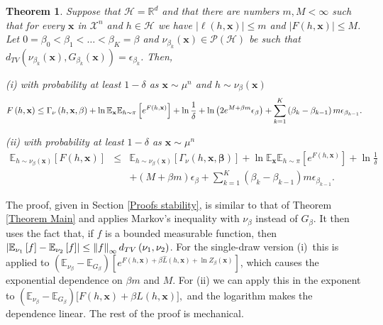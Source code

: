 \documentclass{article} %
\newtheorem{theorem}{Theorem}[section]
\begin{document}
\begin{theorem}
\label{Theorem BV approximations}Suppose that $\mathcal{H}=\mathbb{R}^{d}$
and that there are numbers $m,M<\infty $ such that for every $\mathbf{x}$ in 
$\mathcal{X}^{n}$ and $h\in \mathcal{H}$ we have $\left\vert \ell \left( h,%
\mathbf{x}\right) \right\vert \leq m$ and $\left\vert F\left( h,\mathbf{x}%
\right) \right\vert \leq M$. Let $0=\beta _{0}<\beta _{1}<\dots<\beta
_{K}=\beta $ and $\nu _{\beta _{k}}\left( \mathbf{x}\right) \in \mathcal{P}%
\left( \mathcal{H}\right) $ be such that $d_{TV}\left( \nu _{\beta
_{k}}\left( \mathbf{x}\right) ,G_{\beta_{k} }\left( \mathbf{x}\right) \right)
=\epsilon _{\beta _{k}}$. Then,

(i) with probability at least $1-\delta $ as $\mathbf{x}\sim \mu ^{n}$ and $
h\sim \nu _{\beta }\left( \mathbf{x}\right) $%
\begin{equation*}
F\left( h,\mathbf{x}\right) \leq \Gamma _{\nu }\left( h,\mathbf{x},\mathbf{%
\beta }\right) +\ln \mathbb{E}_{\mathbf{x}}\mathbb{E}_{h\sim \pi }\left[
e^{F\left( h,\mathbf{x}\right) }\right] +\ln \frac{1}{\delta } +\ln \left( 2e^{M+\beta m}\epsilon _{\beta }\right) +\sum_{k=1}^{K}\left(
\beta_{k}-\beta _{k-1}\right) m\epsilon _{\beta _{k-1}}.
\end{equation*}

(ii) with probability at least $1-\delta $ as $\mathbf{x}\sim \mu ^{n}$ 
\begin{eqnarray*}
\mathbb{E}_{h\sim \nu _{\beta }\left( \mathbf{x}\right) }\left[ F\left( h,%
\mathbf{x}\right) \right] &\leq &\mathbb{E}_{h\sim \nu _{\beta }\left( 
\mathbf{x}\right) }\left[ \Gamma _{\nu }\left( h,\mathbf{x},\bm{\beta}%
\right) \right] +\ln \mathbb{E}_{\mathbf{x}}\mathbb{E}_{h\sim \pi }\left[
e^{F\left( h,\mathbf{x}\right) }\right] +\ln \frac{1}{\delta } \\
&&+\left( M+\beta m\right) \epsilon _{\beta }+\sum_{k=1}^{K}\left( \beta
_{k}-\beta _{k-1}\right) m\epsilon _{\beta _{k-1}}.
\end{eqnarray*}
\end{theorem}

The proof, given in Section \ref{Proofs stability}, is
similar to that of Theorem \ref{Theorem Main} and applies Markov's
inequality with $\nu _{\beta }$ instead of $G_{\beta }$. It then uses the
fact that, if $f$ is a bounded measurable function, then $\left\vert \mathbb{%
E}_{\nu _{1}}\left[ f\right] -\mathbb{E}_{\nu _{2}}\left[ f\right]
\right\vert \leq \left\Vert f\right\Vert _{\infty }d_{TV}\left( \nu _{1},\nu
_{2}\right) $. For the single-draw version (i)\ this is applied to $\left( 
\mathbb{E}_{\nu _{\beta }}-\mathbb{E}_{G_{\beta }}\right) \left[ e^{F\left(
h,\mathbf{x}\right) +\beta \hat{L}\left( h,\mathbf{x}\right) +\ln Z_{\beta
}\left( \mathbf{x}\right) }\right] $, which causes the exponential
dependence on $\beta m$ and $M$. For (ii) we can apply this in the exponent to 
$\left( \mathbb{E}_{\nu _{\beta }}-\mathbb{E}_{G_{\beta }}\right) \big[
F( h,\mathbf{x}) +\beta \hat{L}( h,\mathbf{x}) \big],$ and the logarithm makes the dependence linear. The rest of the proof is
mechanical.
\end{document}
